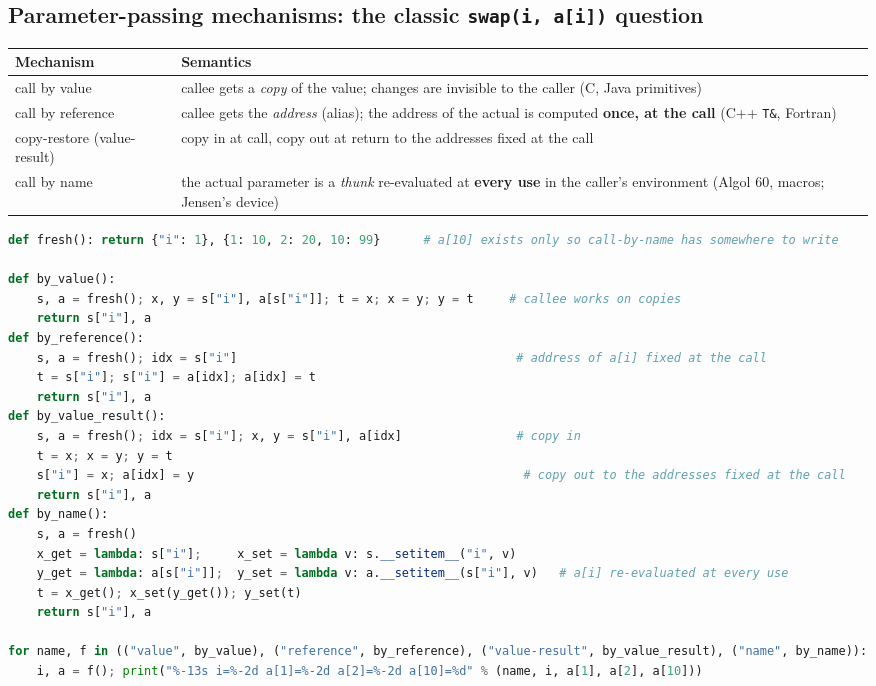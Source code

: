 \documentclass[10pt,a4paper,openany,oneside]{report}
\begin{document}
\subsection{Parameter-passing mechanisms: the classic \texttt{swap(i, a[i])} question}
\begin{center}\small
\begin{xltabular}{\textwidth}{@{}L{2.7cm}Y@{}}
\toprule
\textbf{Mechanism} & \textbf{Semantics}\\
\midrule\endhead
call by value & callee gets a \emph{copy} of the value; changes are invisible to the caller (C, Java primitives)\\
call by reference & callee gets the \emph{address} (alias); the address of the actual is computed \textbf{once, at the call} (C++ \texttt{T\&}, Fortran)\\
copy-restore (value-result) & copy in at call, copy out at return to the addresses fixed at the call\\
call by name & the actual parameter is a \emph{thunk} re-evaluated at \textbf{every use} in the caller's environment (Algol 60, macros; Jensen's device)\\
\bottomrule
\end{xltabular}
\end{center}
\begin{lstlisting}[language={Python},title={swap(x, y) called as swap(i, a[i]) with i=1, a[1]=10, a[2]=20}]
def fresh(): return {"i": 1}, {1: 10, 2: 20, 10: 99}      # a[10] exists only so call-by-name has somewhere to write

def by_value():
    s, a = fresh(); x, y = s["i"], a[s["i"]]; t = x; x = y; y = t     # callee works on copies
    return s["i"], a
def by_reference():
    s, a = fresh(); idx = s["i"]                                       # address of a[i] fixed at the call
    t = s["i"]; s["i"] = a[idx]; a[idx] = t
    return s["i"], a
def by_value_result():
    s, a = fresh(); idx = s["i"]; x, y = s["i"], a[idx]                # copy in
    t = x; x = y; y = t
    s["i"] = x; a[idx] = y                                              # copy out to the addresses fixed at the call
    return s["i"], a
def by_name():
    s, a = fresh()
    x_get = lambda: s["i"];     x_set = lambda v: s.__setitem__("i", v)
    y_get = lambda: a[s["i"]];  y_set = lambda v: a.__setitem__(s["i"], v)   # a[i] re-evaluated at every use
    t = x_get(); x_set(y_get()); y_set(t)
    return s["i"], a

for name, f in (("value", by_value), ("reference", by_reference), ("value-result", by_value_result), ("name", by_name)):
    i, a = f(); print("%-13s i=%-2d a[1]=%-2d a[2]=%-2d a[10]=%d" % (name, i, a[1], a[2], a[10]))
\end{lstlisting}
\end{document}
